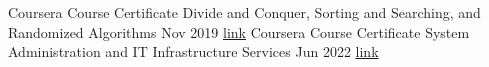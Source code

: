 

\begin{cvcertificates}

\cvcertificate
{Coursera Course Certificate} %
{Divide and Conquer, Sorting and Searching, and Randomized Algorithms} %
{Nov 2019} %
{\href{https://www.coursera.org/account/accomplishments/verify/ZSWGXT5RRQDG}{link}}
\cvcertificate
{Coursera Course Certificate} %
{System Administration and IT Infrastructure Services} %
{Jun 2022} %
{\href{https://coursera.org/verify/FN7ULWH2B6HG}{link}}

\end{cvcertificates}

